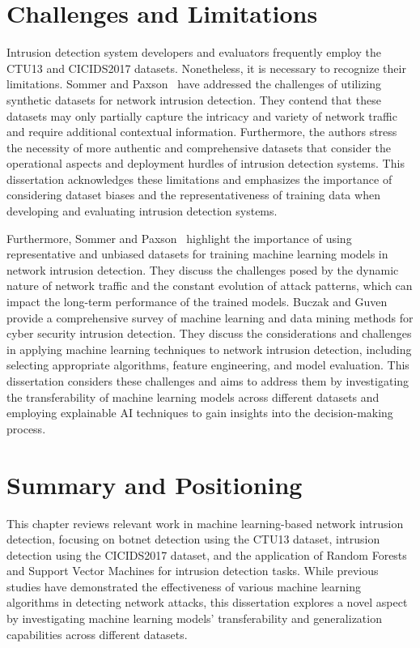 \section{Challenges and Limitations}

Intrusion detection system developers and evaluators frequently employ the CTU13 and CICIDS2017 datasets. Nonetheless, it is necessary to recognize their limitations. Sommer and Paxson~\cite{sommer2010outside} have addressed the challenges of utilizing synthetic datasets for network intrusion detection. They contend that these datasets may only partially capture the intricacy and variety of network traffic and require additional contextual information. Furthermore, the authors stress the necessity of more authentic and comprehensive datasets that consider the operational aspects and deployment hurdles of intrusion detection systems. This dissertation acknowledges these limitations and emphasizes the importance of considering dataset biases and the representativeness of training data when developing and evaluating intrusion detection systems.

Furthermore, Sommer and Paxson~\cite{sommer2010outside} highlight the importance of using representative and unbiased datasets for training machine learning models in network intrusion detection. They discuss the challenges posed by the dynamic nature of network traffic and the constant evolution of attack patterns, which can impact the long-term performance of the trained models. Buczak and Guven~\cite{buczak2015survey} provide a comprehensive survey of machine learning and data mining methods for cyber security intrusion detection. They discuss the considerations and challenges in applying machine learning techniques to network intrusion detection, including selecting appropriate algorithms, feature engineering, and model evaluation. This dissertation considers these challenges and aims to address them by investigating the transferability of machine learning models across different datasets and employing explainable AI techniques to gain insights into the decision-making process.

\section{Summary and Positioning}

This chapter reviews relevant work in machine learning-based network intrusion detection, focusing on botnet detection using the CTU13 dataset, intrusion detection using the CICIDS2017 dataset, and the application of Random Forests and Support Vector Machines for intrusion detection tasks. While previous studies have demonstrated the effectiveness of various machine learning algorithms in detecting network attacks, this dissertation explores a novel aspect by investigating machine learning models' transferability and generalization capabilities across different datasets.

